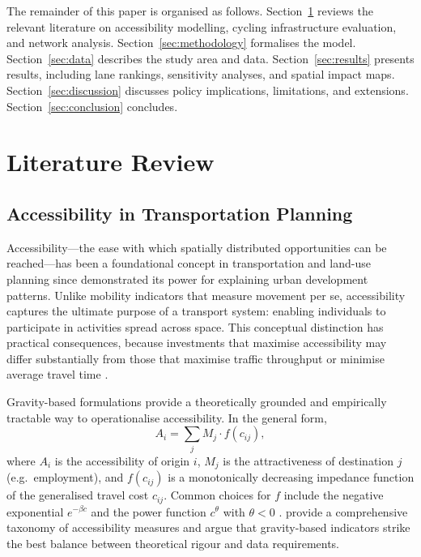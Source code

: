 \documentclass[12pt,a4paper]{article}
\begin{document}
The remainder of this paper is organised as follows. Section~\ref{sec:literature} reviews the relevant literature on accessibility modelling, cycling infrastructure evaluation, and network analysis. Section~\ref{sec:methodology} formalises the model. Section~\ref{sec:data} describes the study area and data. Section~\ref{sec:results} presents results, including lane rankings, sensitivity analyses, and spatial impact maps. Section~\ref{sec:discussion} discusses policy implications, limitations, and extensions. Section~\ref{sec:conclusion} concludes.

\section{Literature Review}
\label{sec:literature}

\subsection{Accessibility in Transportation Planning}

Accessibility---the ease with which spatially distributed opportunities can be reached---has been a foundational concept in transportation and land-use planning since \citet{hansen1959accessibility} demonstrated its power for explaining urban development patterns. Unlike mobility indicators that measure movement per se, accessibility captures the ultimate purpose of a transport system: enabling individuals to participate in activities spread across space. This conceptual distinction has practical consequences, because investments that maximise accessibility may differ substantially from those that maximise traffic throughput or minimise average travel time \citep{levine2012accessibility,levinson2020towards}.

Gravity-based formulations provide a theoretically grounded and empirically tractable way to operationalise accessibility. In the general form,
\begin{equation}
A_i = \sum_j M_j \cdot f(c_{ij}),
\label{eq:general_accessibility}
\end{equation}
where $A_i$ is the accessibility of origin $i$, $M_j$ is the attractiveness of destination $j$ (e.g.\ employment), and $f(c_{ij})$ is a monotonically decreasing impedance function of the generalised travel cost $c_{ij}$. Common choices for $f$ include the negative exponential $e^{-\beta c}$ and the power function $c^{\theta}$ with $\theta < 0$ \citep{fotheringham1989spatial}. \citet{geurs2004accessibility} provide a comprehensive taxonomy of accessibility measures and argue that gravity-based indicators strike the best balance between theoretical rigour and data requirements.
\end{document}
